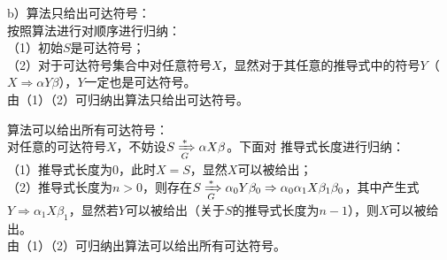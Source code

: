 \begin{solution}
b）算法只给出可达符号：\\
按照算法进行对顺序进行归纳：\\
（1）初始$S$是可达符号；\\
（2）对于可达符号集合中对任意符号$X$，显然对于其任意的推导式中的符号$Y$（$X \Rightarrow \alpha Y \beta$），$Y$一定也是可达符号。\\
由（1）（2）可归纳出算法只给出可达符号。

算法可以给出所有可达符号：\\
对任意的可达符号$X$，不妨设$S \xRightarrow[G]{*} \alpha X\beta$。下面对
推导式长度进行归纳：\\
（1）推导式长度为0，此时$X=S$，显然$X$可以被给出；\\
（2）推导式长度为$n>0$，则存在$S \xRightarrow[G]{*} \alpha_0 Y\beta_0 \Rightarrow \alpha_0\alpha_1 X\beta_1\beta_0$，其中产生式
$Y\Rightarrow \alpha_1 X\beta_1$，显然若$Y$可以被给出（关于$S$的推导式长度为$n-1$），则$X$可以被给出。\\
由（1）（2）可归纳出算法可以给出所有可达符号。
\end{solution}
